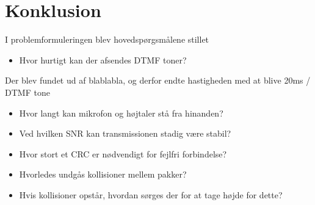 \section{Konklusion}
I problemformuleringen blev hovedspørgsmålene stillet

	\begin{itemize}
	\item Hvor hurtigt kan der afsendes DTMF toner?
	\end{itemize}
Der blev fundet ud af blablabla, og derfor endte hastigheden med at blive 20ms / DTMF tone

	\begin{itemize}
	\item Hvor langt kan mikrofon og højtaler stå fra hinanden?
	\end{itemize}


	\begin{itemize}
	\item Ved hvilken SNR kan transmissionen stadig være stabil?
	\end{itemize}
	

	\begin{itemize}
	\item Hvor stort et CRC er nødvendigt for fejlfri forbindelse?
	\end{itemize}
	

	\begin{itemize}
	\item Hvorledes undgås kollisioner mellem pakker?
	\end{itemize}
	

	\begin{itemize}
	\item Hvis kollisioner opstår, hvordan sørges der for at tage højde for dette?
	\end{itemize}
	

